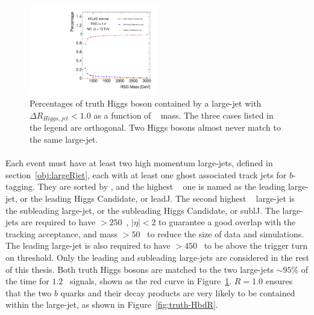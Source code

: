 \begin{figure}[htbp!]
  \begin{center}
  \includegraphics[width=0.5\textwidth,angle=-90]{figures/boosted/Truth/truth_higgs-matching.pdf}
  \caption{Percentages of truth Higgs boson contained by a large-\R jet with $\Delta R_{Higgs, jet}<1.0$ as a function of \Grav~ mass. The three cases listed in the legend are orthogonal. Two Higgs bosons almost never match to the same large-\R jet.}
  \label{fig:truth-Higgs-largeRjet}
\end{center}
\end{figure}

\paragraph{}
Each event must have at least two high momentum large-\R jets, defined in section~\ref{obj:largeRjet}, each with at least one ghost associated track jets for $b$-tagging.
They are sorted by \pt, and the highest \pt~ one is named as the leading large-\R jet, or the leading Higgs Candidate, or leadJ.
The second highest \pt~ large-\R jet is the subleading large-\R jet, or the subleading Higgs Candidate, or sublJ.
The large-\R jets are required to have \pt $> 250$\GeV~, $|\eta| < 2$ to guarantee a good overlap with the tracking acceptance, and mass $> 50$\GeV~ to reduce the size of data and simulations.
The leading large-\R jet is also required to have \pt $> 450$\GeV~ to be above the trigger turn on threshold.
Only the leading and subleading large-\R jets are considered in the rest of this thesis.
Both truth Higgs bosons are matched to the two large-\R jets $\sim 95\%$ of the time for $1.2$\TeV~ signals, shown as the red curve in Figure~\ref{fig:truth-Higgs-largeRjet}. 
$R = 1.0$ ensures that the two $b$ quarks and their decay products are very likely to be contained within the large-\R jet, as shown in Figure~\ref{fig:truth-HbdR}. 

